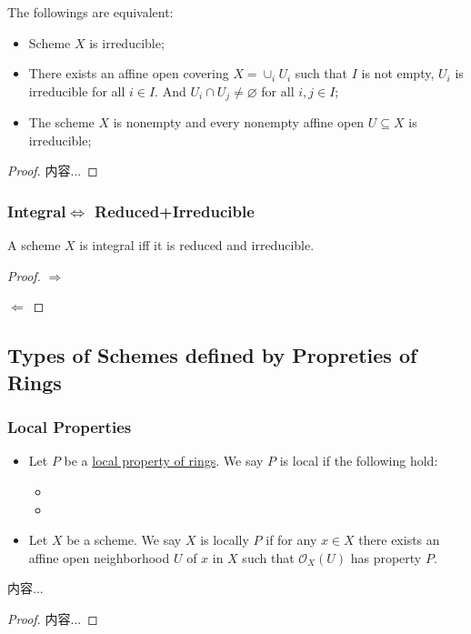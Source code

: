 \documentclass[Total.tex]{subfiles}
\begin{document}
						\begin{lemma}
							The followings are equivalent:
							\begin{itemize}
								\item Scheme $X$ is irreducible;
								\item There exists an affine open covering $X=\cup_i U_i$ such that $I$ is not empty, $U_i$ is irreducible for all $i\in I$. And $U_i\cap U_j\not=\varnothing$ for all $i,j\in I$; 
								\item The scheme $X$ is nonempty and every nonempty affine open $U\subseteq X$ is irreducible;
							\end{itemize}
						\end{lemma}
						\begin{proof}
							内容...
						\end{proof}
					\subsubsection{Integral$\Leftrightarrow$ Reduced+Irreducible}
						\begin{proposition}
							A scheme $X$ is integral iff it is reduced and irreducible.
						\end{proposition}
						\begin{proof}
							$\Rightarrow$
							
							$\Leftarrow$
						\end{proof}
				\subsection{Types of Schemes defined by Propreties of Rings}
					\subsubsection{Local Properties}
						\begin{Def}
							\begin{itemize}
								\item Let $P$ be a \underline{local property of rings}. We say $P$ is local if the following hold:
								\begin{itemize}
									\item 
									\item 
								\end{itemize}
								\item Let $X$ be a scheme. We say $X$ is locally $P$ if for any $x\in X$ there exists an affine open neighborhood $U$ of $x$ in $X$ such that $\mathcal{O}_X(U)$ has property $P$.
							\end{itemize}
						\end{Def}
						\begin{lemma}
							内容...
						\end{lemma}
						\begin{proof}
							内容...
						\end{proof}
						
\end{document}
